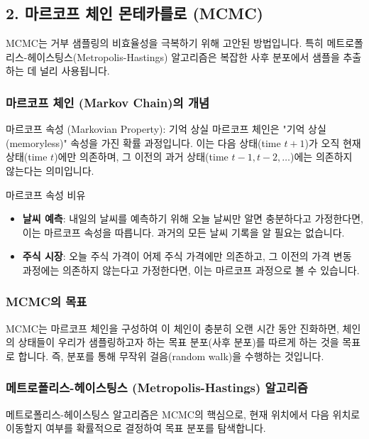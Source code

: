 \documentclass[11pt,a4paper]{article}
\begin{document}
\subsection*{2. 마르코프 체인 몬테카를로 (MCMC)}
MCMC는 거부 샘플링의 비효율성을 극복하기 위해 고안된 방법입니다. 특히 메트로폴리스-헤이스팅스(Metropolis-Hastings) 알고리즘은 복잡한 사후 분포에서 샘플을 추출하는 데 널리 사용됩니다.

\subsubsection*{마르코프 체인 (Markov Chain)의 개념}
\begin{mybox}{마르코프 속성 (Markovian Property): 기억 상실}
마르코프 체인은 "기억 상실(memoryless)" 속성을 가진 확률 과정입니다. 이는 다음 상태(time $t+1$)가 오직 현재 상태(time $t$)에만 의존하며, 그 이전의 과거 상태(time $t-1, t-2, \dots$)에는 의존하지 않는다는 의미입니다.
\end{mybox}

\begin{examplebox}{마르코프 속성 비유}
\begin{itemize}
    \item \textbf{날씨 예측}: 내일의 날씨를 예측하기 위해 오늘 날씨만 알면 충분하다고 가정한다면, 이는 마르코프 속성을 따릅니다. 과거의 모든 날씨 기록을 알 필요는 없습니다.
    \item \textbf{주식 시장}: 오늘 주식 가격이 어제 주식 가격에만 의존하고, 그 이전의 가격 변동 과정에는 의존하지 않는다고 가정한다면, 이는 마르코프 과정으로 볼 수 있습니다.
\end{itemize}
\end{examplebox}

\subsubsection*{MCMC의 목표}
MCMC는 마르코프 체인을 구성하여 이 체인이 충분히 오랜 시간 동안 진화하면, 체인의 상태들이 우리가 샘플링하고자 하는 목표 분포(사후 분포)를 따르게 하는 것을 목표로 합니다. 즉, 분포를 통해 무작위 걸음(random walk)을 수행하는 것입니다.

\subsubsection*{메트로폴리스-헤이스팅스 (Metropolis-Hastings) 알고리즘}
메트로폴리스-헤이스팅스 알고리즘은 MCMC의 핵심으로, 현재 위치에서 다음 위치로 이동할지 여부를 확률적으로 결정하여 목표 분포를 탐색합니다.
\end{document}
